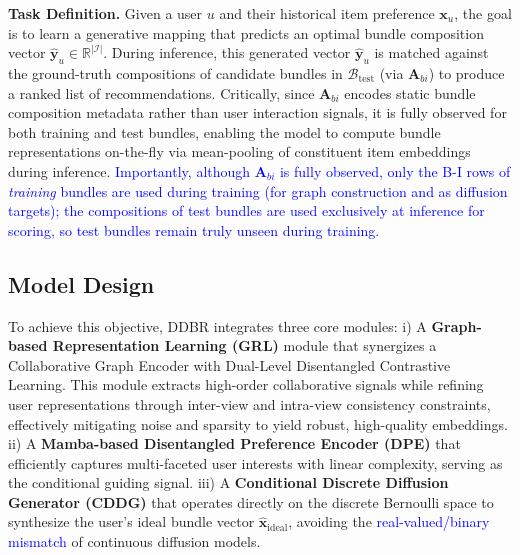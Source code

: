 \documentclass[lettersize,journal]{IEEEtran}
\newcommand{\revise}[1]{\textcolor{blue}{#1}}
\begin{document}
\noindent \textbf{Task Definition.}
Given a user $u$ and their historical item preference $\mathbf{x}_u$, the goal is to learn a generative mapping that predicts an optimal bundle composition vector $\hat{\mathbf{y}}_u \in \mathbb{R}^{|\mathcal{I}|}$.
During inference, this generated vector $\hat{\mathbf{y}}_u$ is matched against the ground-truth compositions of candidate bundles in $\mathcal{B}_{\text{test}}$ (via $\mathbf{A}_{bi}$) to produce a ranked list of recommendations. Critically, since $\mathbf{A}_{bi}$ encodes static bundle composition metadata rather than user interaction signals, it is fully observed for both training and test bundles, enabling the model to compute bundle representations on-the-fly via mean-pooling of constituent item embeddings during inference. \revise{Importantly, although $\mathbf{A}_{bi}$ is fully observed, only the B-I rows of \emph{training} bundles are used during training (for graph construction and as diffusion targets); the compositions of test bundles are used exclusively at inference for scoring, so test bundles remain truly unseen during training.}

\subsection{Model Design}
To achieve this objective, DDBR integrates three core modules: 
i) A \textbf{Graph-based Representation Learning (GRL)} module that synergizes a Collaborative Graph Encoder with Dual-Level Disentangled Contrastive Learning. This module extracts high-order collaborative signals while refining user representations through inter-view and intra-view consistency constraints, effectively mitigating noise and sparsity to yield robust, high-quality embeddings. 
ii) A \textbf{Mamba-based Disentangled Preference Encoder (DPE)} that efficiently captures multi-faceted user interests with linear complexity, serving as the conditional guiding signal. iii) A \textbf{Conditional Discrete Diffusion Generator (CDDG)} that operates directly on the discrete Bernoulli space to synthesize the user's ideal bundle vector $\hat{\mathbf{x}}_{\text{ideal}}$, avoiding the \revise{real-valued/binary mismatch} of continuous diffusion models.

\end{document}
